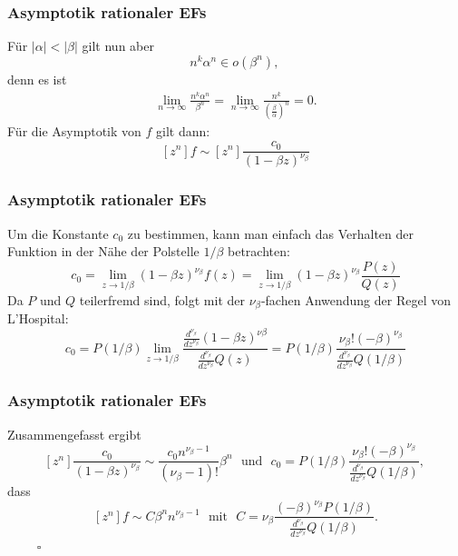 \documentclass{beamer}
\begin{document}
\begin{frame}\frametitle{Asymptotik rationaler EFs}
  Für $|\alpha| < |\beta|$ gilt nun aber
  \[
    n^k \alpha^n \in o(\beta^n) \text{, }
  \]
  denn es ist
  \begin{align*}
    \lim\limits_{n \rightarrow \infty} \frac{n^k \alpha^n}{\beta^n}
    = \lim\limits_{n \rightarrow \infty} \frac{n^k}{\left( \frac{\beta}{\alpha} \right)^n} = 0 \text{.}
  \end{align*}
  Für die Asymptotik von $f$ gilt dann:
  \[
    [z^n] f \sim [z^n] \frac{c_0}{(1 - \beta z)^{\nu_\beta}}
  \]
\end{frame}

\begin{frame}\frametitle{Asymptotik rationaler EFs}
  Um die Konstante $c_0$ zu bestimmen, kann man einfach das Verhalten der Funktion in der Nähe der Polstelle $1 / \beta$ betrachten:
  \[
    c_0 = \lim\limits_{z \rightarrow 1 / \beta} (1 - \beta z)^{\nu_\beta} f(z) = \lim\limits_{z \rightarrow 1 / \beta} (1 - \beta z)^{\nu_\beta} \frac{P(z)}{Q(z)}
  \]
  Da $P$ und $Q$ teilerfremd sind, folgt mit der $\nu_\beta$-fachen Anwendung der Regel von L’Hospital:
  \[
    c_0 = P(1 / \beta) \lim\limits_{z \rightarrow 1 / \beta} \frac{\frac{d^{\nu_\beta}}{dz^{\nu_\beta}} (1 - \beta z)^{\nu\beta}}{\frac{d^{\nu_\beta}}{dz^{\nu_\beta}} Q(z)} = P(1 / \beta) \frac{\nu_\beta! (-\beta)^{\nu_\beta}}{\frac{d^{\nu_\beta}}{dz^{\nu_\beta}} Q(1 / \beta)}
  \]
\end{frame}

\begin{frame}\frametitle{Asymptotik rationaler EFs}
  Zusammengefasst ergibt
  \[
    [z^n] \frac{c_0}{(1 - \beta z)^{\nu_\beta}}
    \sim \frac{c_0 n^{\nu_\beta - 1}}{(\nu_\beta - 1)!} \beta^n \,\, \text{ und } \,\,
    c_0 = P(1 / \beta) \frac{\nu_\beta! (-\beta)^{\nu_\beta}}{\frac{d^{\nu_\beta}}{dz^{\nu_\beta}} Q(1 / \beta)} \text{, }
  \]
  dass
  \[
    [z^n] f \sim C \beta^n n^{\nu_\beta - 1} \,\, \text{ mit } \,\, C = \nu_\beta \frac{(-\beta)^{\nu_\beta} P(1 / \beta)}{\frac{d^{\nu_\beta}}{dz^{\nu_\beta}} Q(1 / \beta)} \text{.}
  \]
  $\qquad$
  \hfill
  $\square$
\end{frame}
\end{document}
